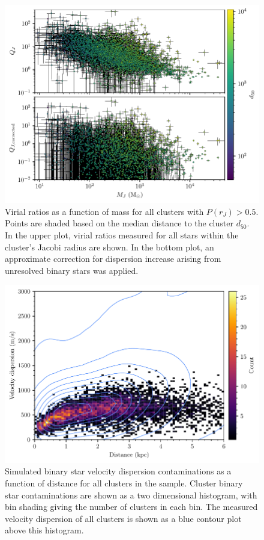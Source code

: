 \begin{figure}[t]
    \centering
    \includegraphics[width=\textwidth]{fig/c4/results_virial_vs_mass.pdf}
    \caption[Virial ratios as a function of mass for all clusters with $P(r_J) > 0.5$]{Virial ratios as a function of mass for all clusters with $P(r_J) > 0.5$. Points are shaded based on the median distance to the cluster $d_{50}$. In the upper plot, virial ratios measured for all stars within the cluster's Jacobi radius are shown. In the bottom plot, an approximate correction for dispersion increase arising from unresolved binary stars was applied.}
    \label{fig:dynamics:results:virial_vs_mass}
\end{figure}

\begin{figure}[t]
    \centering
    \includegraphics[width=\textwidth]{fig/c4/dispersion_binaries.pdf}
    \caption[Simulated binary star velocity dispersion contaminations as a function of distance for all clusters in the sample]{Simulated binary star velocity dispersion contaminations as a function of distance for all clusters in the sample. Cluster binary star contaminations are shown as a two dimensional histogram, with bin shading giving the number of clusters in each bin. The measured velocity dispersion of all clusters is shown as a blue contour plot above this histogram.}
    \label{fig:dynamics:velocities:binary_contamination}
\end{figure}

